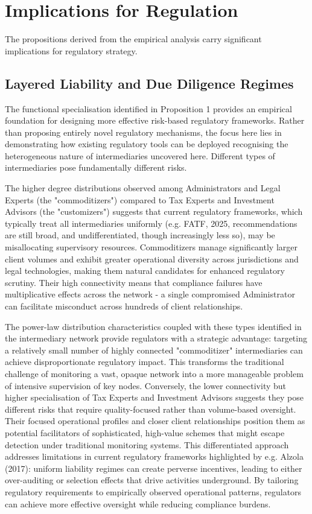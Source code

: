 \section{Implications for Regulation}
\label{sec:implications_regulation}

The propositions derived from the empirical analysis carry significant implications for regulatory strategy.

\subsection{Layered Liability and Due Diligence Regimes}
\label{subsec:layered_liability}

The functional specialisation identified in Proposition 1 provides an empirical foundation for designing more effective risk-based regulatory frameworks. Rather than proposing entirely novel regulatory mechanisms, the focus here lies in demonstrating how existing regulatory tools can be deployed recognising the heterogeneous nature of intermediaries uncovered here. Different types of intermediaries pose fundamentally different risks.

The higher degree distributions observed among Administrators and Legal Experts (the "commoditizers") compared to Tax Experts and Investment Advisors (the "customizers") suggests that current regulatory frameworks, which typically treat all intermediaries uniformly (e.g. FATF, 2025, recommendations are still broad, and undifferentiated, though increasingly less so), may be misallocating supervisory resources. Commoditizers manage significantly larger client volumes and exhibit greater operational diversity across jurisdictions and legal technologies, making them natural candidates for enhanced regulatory scrutiny. Their high connectivity means that compliance failures have multiplicative effects across the network - a single compromised Administrator can facilitate misconduct across hundreds of client relationships. 

The power-law distribution characteristics coupled with these types identified in the intermediary network provide regulators with a strategic advantage: targeting a relatively small number of highly connected "commoditizer" intermediaries can achieve disproportionate regulatory impact. This transforms the traditional challenge of monitoring a vast, opaque network into a more manageable problem of intensive supervision of key nodes.  Conversely, the lower connectivity but higher specialisation of Tax Experts and Investment Advisors suggests they pose different risks that require quality-focused rather than volume-based oversight. Their focused operational profiles and closer client relationships position them as potential facilitators of sophisticated, high-value schemes that might escape detection under traditional monitoring systems. This differentiated approach addresses limitations in current regulatory frameworks highlighted by e.g. Alzola (2017): uniform liability regimes can create perverse incentives, leading to either over-auditing or selection effects that drive activities underground. By tailoring regulatory requirements to empirically observed operational patterns, regulators can achieve more effective oversight while reducing compliance burdens.

